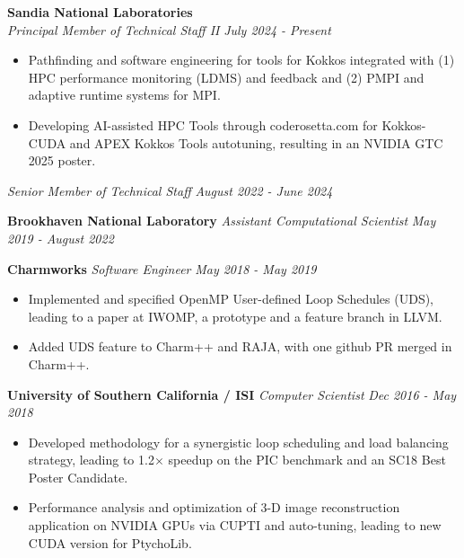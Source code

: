 \newcommand{\myExpOne}{
\item Pathfinding and software engineering for tools for Kokkos integrated with (1) HPC performance monitoring (LDMS) and feedback and (2) PMPI and adaptive runtime systems for MPI.
\item Developing AI-assisted HPC Tools through coderosetta.com for Kokkos-CUDA and APEX Kokkos Tools autotuning, resulting in an NVIDIA GTC 2025 poster. 
}
\textbf{Sandia National Laboratories}\\
\textit{Principal Member of Technical Staff II} \hfill \textit{July 2024 - Present}
\noindent
\begin{itemize}[itemsep=-0.1em]\onlyitems[include={1,2}]
\myExpOne
\end{itemize}

\noindent
\textit{Senior Member of Technical Staff} \hfill \textit{August 2022 - June 2024}
\begin{itemize}[itemsep=-0.1em]
\myExpTwo 
\end{itemize} 
\textbf{Brookhaven National Laboratory}\hfill
\textit{Assistant Computational Scientist} \hfill \textit{May 2019 - August 2022}
\begin{itemize}[itemsep=-0.1em]
\myExpThree
\end{itemize}


\newcommand{\myExpFour}{
\item Implemented and specified OpenMP User-defined Loop Schedules (UDS), leading to a paper at IWOMP, a prototype and a feature branch in LLVM. 
\item Added UDS feature to Charm++ and RAJA, with one github PR merged in Charm++.
}
\noindent
\textbf{Charmworks}\hfill
\textit{Software Engineer} \hfill \textit{May 2018 - May 2019}
\vspace{-0.01in}
\begin{itemize}[itemsep=-0.1em]
\myExpFour
\end{itemize}

\newcommand{\myExpFive}{
\item Developed  methodology for a synergistic loop scheduling and load balancing strategy, leading to 1.2$\times$ speedup on the PIC benchmark and an SC18 Best Poster Candidate.

\item Performance analysis and optimization of 3-D image reconstruction application on NVIDIA GPUs via CUPTI and auto-tuning, leading to new CUDA version for PtychoLib. 
}
\noindent
\textbf{University of Southern California / ISI}\hfill
\textit{Computer Scientist} \hfill \textit{Dec 2016 - May 2018}
\begin{itemize}[itemsep=-0.2em]
\myExpFive
\end{itemize}

